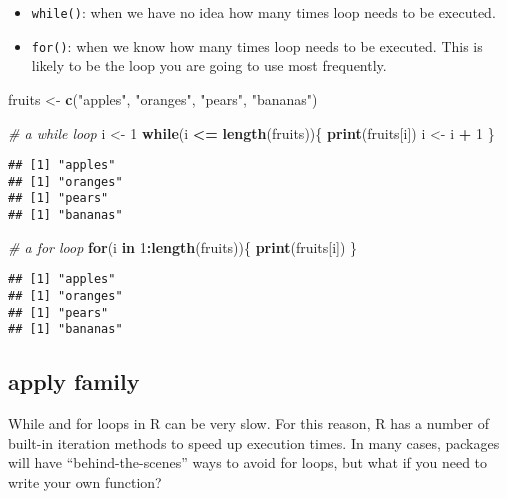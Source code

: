 \documentclass[
]{book}
\newenvironment{Shaded}{\begin{snugshade}}{\end{snugshade}}
\newcommand{\CommentTok}[1]{\textcolor[rgb]{0.56,0.35,0.01}{\textit{#1}}}
\newcommand{\ControlFlowTok}[1]{\textcolor[rgb]{0.13,0.29,0.53}{\textbf{#1}}}
\newcommand{\DecValTok}[1]{\textcolor[rgb]{0.00,0.00,0.81}{#1}}
\newcommand{\KeywordTok}[1]{\textcolor[rgb]{0.13,0.29,0.53}{\textbf{#1}}}
\newcommand{\NormalTok}[1]{#1}
\newcommand{\OperatorTok}[1]{\textcolor[rgb]{0.81,0.36,0.00}{\textbf{#1}}}
\newcommand{\StringTok}[1]{\textcolor[rgb]{0.31,0.60,0.02}{#1}}
\providecommand{\tightlist}{%
  \setlength{\itemsep}{0pt}\setlength{\parskip}{0pt}}
\begin{document}
\begin{itemize}
\tightlist
\item
  \texttt{while()}: when we have no idea how many times loop needs to be executed.
\item
  \texttt{for()}: when we know how many times loop needs to be executed. This is likely to be the loop you are going to use most frequently.
\end{itemize}

\begin{Shaded}
\begin{Highlighting}[]
\NormalTok{fruits \textless{}{-}}\StringTok{ }\KeywordTok{c}\NormalTok{(}\StringTok{"apples"}\NormalTok{, }\StringTok{"oranges"}\NormalTok{, }\StringTok{"pears"}\NormalTok{, }\StringTok{"bananas"}\NormalTok{)}

\CommentTok{\# a while loop}
\NormalTok{i \textless{}{-}}\StringTok{ }\DecValTok{1}
\ControlFlowTok{while}\NormalTok{(i }\OperatorTok{\textless{}=}\StringTok{ }\KeywordTok{length}\NormalTok{(fruits))\{}
  \KeywordTok{print}\NormalTok{(fruits[i])}
\NormalTok{  i \textless{}{-}}\StringTok{ }\NormalTok{i }\OperatorTok{+}\StringTok{ }\DecValTok{1}
\NormalTok{\}}
\end{Highlighting}
\end{Shaded}

\begin{verbatim}
## [1] "apples"
## [1] "oranges"
## [1] "pears"
## [1] "bananas"
\end{verbatim}

\begin{Shaded}
\begin{Highlighting}[]
\CommentTok{\# a for loop}
\ControlFlowTok{for}\NormalTok{(i }\ControlFlowTok{in} \DecValTok{1}\OperatorTok{:}\KeywordTok{length}\NormalTok{(fruits))\{}
  \KeywordTok{print}\NormalTok{(fruits[i])}
\NormalTok{\}}
\end{Highlighting}
\end{Shaded}

\begin{verbatim}
## [1] "apples"
## [1] "oranges"
## [1] "pears"
## [1] "bananas"
\end{verbatim}

\hypertarget{apply-family}{%
\subsection{apply family}\label{apply-family}}

While and for loops in R can be very slow. For this reason, R has a number of built-in iteration methods to speed up execution times. In many cases, packages will have ``behind-the-scenes'' ways to avoid for loops, but what if you need to write your own function?
\end{document}

